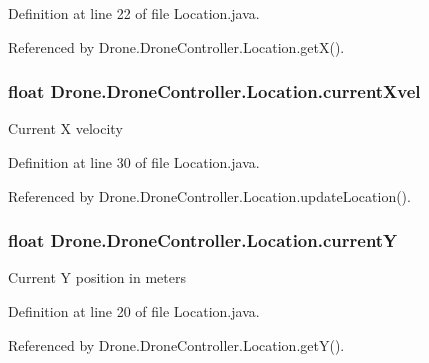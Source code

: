 Definition at line 22 of file Location.\+java.



Referenced by Drone.\+Drone\+Controller.\+Location.\+get\+X().

\hypertarget{class_drone_1_1_drone_controller_1_1_location_a8691b4eb0647ca3cf7d3a93f87bc6704}{}
\subsubsection[{current\+Xvel}]{\setlength{\rightskip}{0pt plus 5cm}float Drone.\+Drone\+Controller.\+Location.\+current\+Xvel\hspace{0.3cm}{\ttfamily [private]}}\label{class_drone_1_1_drone_controller_1_1_location_a8691b4eb0647ca3cf7d3a93f87bc6704}
Current X velocity 

Definition at line 30 of file Location.\+java.



Referenced by Drone.\+Drone\+Controller.\+Location.\+update\+Location().

\hypertarget{class_drone_1_1_drone_controller_1_1_location_a27aef452beeabcbace54668504ca341d}{}
\subsubsection[{current\+Y}]{\setlength{\rightskip}{0pt plus 5cm}float Drone.\+Drone\+Controller.\+Location.\+current\+Y\hspace{0.3cm}{\ttfamily [private]}}\label{class_drone_1_1_drone_controller_1_1_location_a27aef452beeabcbace54668504ca341d}
Current Y position in meters 

Definition at line 20 of file Location.\+java.



Referenced by Drone.\+Drone\+Controller.\+Location.\+get\+Y().

\hypertarget{class_drone_1_1_drone_controller_1_1_location_adff5260059e632576967773ffd15f219}{}
